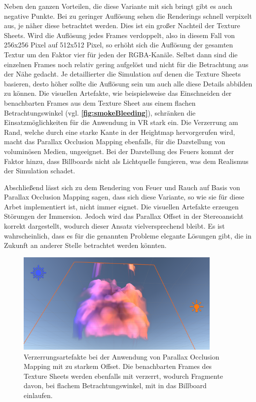 Neben den ganzen Vorteilen, die diese Variante mit sich bringt gibt es auch negative Punkte. Bei zu geringer Auflösung sehen die Renderings schnell
verpixelt aus, je näher diese betrachtet werden. Dies ist ein großer Nachteil der Texture Sheets. Wird die Auflösung jedes Frames verdoppelt, also in diesem
Fall von 256x256 Pixel auf 512x512 Pixel, so erhöht sich die Auflösung der gesamten Textur um den Faktor vier für jeden der RGBA-Kanäle. Selbst dann sind
die einzelnen Frames noch relativ gering aufgelöst und nicht für die Betrachtung aus der Nähe gedacht. Je detaillierter die Simulation auf denen die Texture Sheets basieren,
desto höher sollte die Auflösung sein um auch alle diese Details abbilden zu können.
Die visuellen Artefakte, wie beispielsweise das Einschneiden der benachbarten Frames aus dem Texture Sheet aus einem flachen Betrachtungswinkel (vgl. \textbf{\autoref{fig:smokeBleeding}}),
schränken die Einsatzmöglichkeiten für die Anwendung in VR stark ein. Die Verzerrung am Rand, welche durch eine starke Kante in der Heightmap hervorgerufen wird, macht das
Parallax Occlusion Mapping ebenfalls, für die Darstellung von voluminösen Medien, ungeeignet. 
Bei der Darstellung des Feuers kommt der Faktor hinzu, dass Billboards nicht als Lichtquelle fungieren, was dem Realismus der Simulation schadet.

Abschließend lässt sich zu dem Rendering von Feuer und Rauch auf Basis von Parallax Occlusion Mapping sagen, dass sich diese Variante, so wie sie für diese Arbet
implementiert ist, nicht immer eignet. Die visuellen Artefakte erzeugen Störungen der Immersion. Jedoch wird das Parallax Offset in der Stereoansicht korrekt dargestellt,
wodurch dieser Ansatz vielversprechend bleibt. Es ist wahrscheinlich, dass es für die genannten Probleme elegante Lösungen gibt, die in Zukunft an anderer Stelle 
betrachtet werden könnten.


\begin{figure}[h!]
	\includegraphics[width=0.89\textwidth]{Grafiken/Evaluation/Smoke_artefacts.png}
	\centering
	\begin{footnotesize}
		\caption{Verzerrungsartefakte bei der Anwendung von Parallax Occlusion Mapping mit zu starkem Offset. Die benachbarten Frames des Texture Sheets
			werden ebenfalls mit verzerrt, wodurch Fragmente davon, bei flachem Betrachtungswinkel, mit in das Billboard einlaufen.}
		\label{fig:smokeBleeding}
	\end{footnotesize}
\end{figure}



